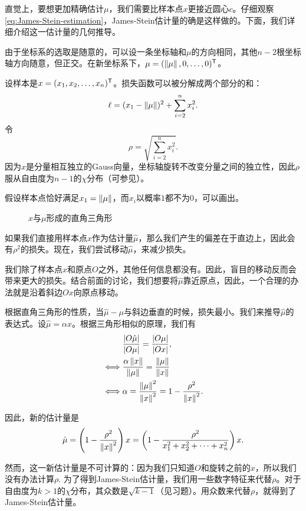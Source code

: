 直觉上，要想更加精确估计$\mu$，我们需要比样本点$x$更接近圆心$c$。仔细观察 \eqref{eq:James-Stein-estimation}，James-Stein估计量的确是这样做的。下面，我们详细介绍这一估计量的几何推导。

由于坐标系的选取是随意的，可以设一条坐标轴和$\mu$的方向相同，其他$n-2$根坐标轴方向随意，但正交。在新坐标系下，$\mu = (\left\|\mu\right\|,0,\dots,0)^{\mathsf{T}}$。

设样本是$x=(x_1,x_2,\dots,x_n)^{\mathsf{T}}$。损失函数可以被分解成两个部分的和：
\begin{equation}
    \ell=(x_1-\left\|\mu\right\|)^2+\sum_{i=2}^nx_i^2. \label{eq:loss-decomposition}
\end{equation}
令
\[\rho = \sqrt{\sum_{i=2}^n x_i^2}.\]
因为$x$是分量相互独立的Gauss向量，坐标轴旋转不改变分量之间的独立性，因此$\rho$服从自由度为$n-1$的$\chi$分布（可参见）。

假设样本点恰好满足$x_1=\left\|\mu\right\|$，而$x_i$以概率$1$都不为$0$，可以画出。
\begin{figure}[ht]
    \centering
    
    \caption{$x$与$\mu$形成的直角三角形}
    \label{fig:triangle}
\end{figure}

如果我们直接用样本点$x$作为估计量$\hat\mu$，那么我们产生的偏差在于直边上，因此会有$\rho^2$的损失。现在，我们尝试移动$\hat\mu$，来减少损失。

我们除了样本点$x$和原点$O$之外，其他任何信息都没有。因此，盲目的移动反而会带来更大的损失。结合前面的讨论，我们想要将$\hat\mu$靠近原点，因此，一个合理的办法就是沿着斜边$Ox$向原点移动。

根据直角三角形的性质，当$\hat\mu-\mu$与斜边垂直的时候，损失最小。我们来推导$\hat\mu$的表达式。设$\hat\mu=\alpha x$。根据三角形相似的原理，我们有
\begin{align*}
    &\frac{|O\hat\mu|}{|O\mu|}= \frac{|O\mu|}{|Ox|},\\
    \iff&\frac{\alpha\left\|x\right\|}{\left\|\mu\right\|}=\frac{\left\|\mu\right\|}{\left\|x\right\|}\\
    \iff&\alpha = \frac{\left\|\mu\right\|^2}{\left\|x\right\|^2}=1-\frac{\rho^2}{\left\|x\right\|^2}.
\end{align*}

因此，新的估计量是
\[\hat\mu = \left(1-\frac{\rho^2}{\left\|x\right\|^2}\right)x=\left(1-\frac{\rho^2}{x_1^2+x_2^2+\dots+x_n^2}\right)x.\]

然而，这一新估计量是不可计算的：因为我们只知道$O$和旋转之前的$x$，所以我们没有办法计算$\rho$. 为了得到James-Stein估计量，我们用一些数字特征来代替$\rho$。对于自由度为$k>1$的$\chi$分布，其众数是$\sqrt{k-1}$（见习题）。用众数来代替$\rho$，就得到了James-Stein估计量。

